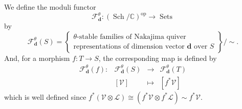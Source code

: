 \documentclass{amsart}
\theoremstyle{plain}
\numberwithin{equation}{section}
\theoremstyle{definition}
\theoremstyle{remark}
\begin{document}
	We define the moduli functor
	\begin{equation}\label{moduliFunctorNakajimaQuiverRepresentations}
	\mathcal F_{\mathbf d}^{\theta}:(\operatorname{Sch}/\mathbb C)^{\operatorname{op}}\longrightarrow \operatorname{Sets}
	\end{equation}
	by
	$$
	\mathcal F_{\mathbf d}^{\theta}(S)
	=
	\left\{
	\begin{array}{c}
		\text{\(\theta\)-stable families of Nakajima quiver}\\
		\text{representations of dimension vector \(\mathbf d\) over \(S\)}
	\end{array}
	\right\}
	\Big/\sim.
	$$
	And, for a morphism $f:T\to S$, the corresponding map is defined by
	$$
	\begin{matrix}
			\mathcal F_{\mathbf d}^{\theta}(f):&	\mathcal F_{\mathbf d}^{\theta}(S)&\longrightarrow& \mathcal F_{\mathbf d}^{\theta}(T)\\
		&	[\mathcal V]&\longmapsto&[f^*\mathcal V]
	\end{matrix}
	$$
	which is well defined since
	$f^*(\mathcal V\otimes\mathcal L)\cong (f^*\mathcal V\otimes f^*\mathcal L)\sim f^*\mathcal{V}$.
	
\end{document}
